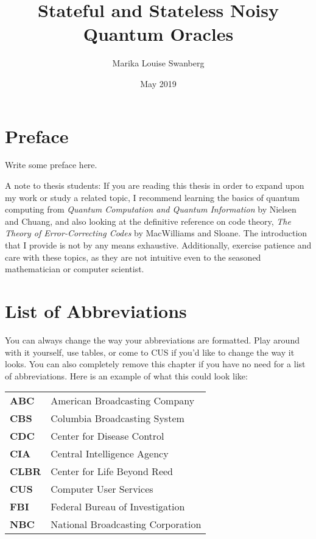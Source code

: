 \documentclass[12pt,twoside]{reedthesis}
\title{Stateful and Stateless Noisy Quantum Oracles}
\author{Marika Louise Swanberg}
\date{May 2019}
\begin{document}
  \maketitle
  \frontmatter %
  \pagestyle{empty} %


   \chapter*{Preface}
Write some preface here.

A note to thesis students: If you are reading this thesis in order to expand upon my work or study a related topic, I recommend learning the basics of quantum computing from \textit{Quantum Computation and Quantum Information} by Nielsen and Chuang, and also looking at the definitive reference on code theory, \textit{The Theory of Error-Correcting Codes} by MacWilliams and Sloane. The introduction that I provide is not by any means exhaustive. Additionally, exercise patience and care with these topics, as they are not intuitive even to the seasoned mathematician or computer scientist. 

	
	

    \chapter*{List of Abbreviations}
		You can always change the way your abbreviations are formatted. Play around with it yourself, use tables, or come to CUS if you'd like to change the way it looks. You can also completely remove this chapter if you have no need for a list of abbreviations. Here is an example of what this could look like:

	\begin{table}[h]
	\centering %
	\begin{tabular}{ll}
		\textbf{ABC}  	&  American Broadcasting Company \\
		\textbf{CBS}  	&  Columbia Broadcasting System\\
		\textbf{CDC}  	&  Center for Disease Control \\
		\textbf{CIA}  	&  Central Intelligence Agency\\
		\textbf{CLBR} 	&  Center for Life Beyond Reed\\
		\textbf{CUS}  	&  Computer User Services\\
		\textbf{FBI}  	&  Federal Bureau of Investigation\\
		\textbf{NBC}  	&  National Broadcasting Corporation\\
	\end{tabular}
	\end{table}
	
\end{document}
